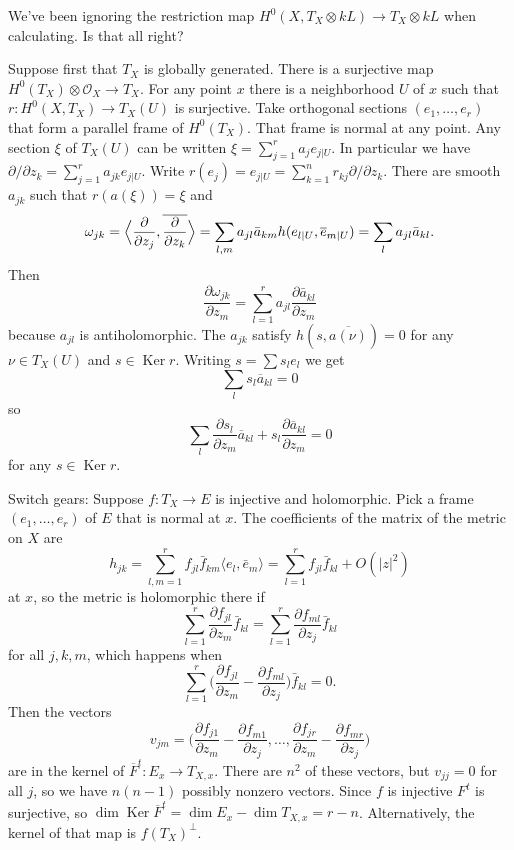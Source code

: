 \documentclass[12pt]{amsart}
\theoremstyle{definition}
\newcommand{\cc}[1]{\mathcal{#1}}
\def\ov#1{\overline{#1}}
\DeclareMathOperator{\Ker}{Ker}
\def\<{\langle}
\def\>{\rangle}
\begin{document}
We've been ignoring the restriction map $H^0(X, T_X \otimes kL) \to T_X \otimes kL$ when calculating.
Is that all right?


Suppose first that $T_X$ is globally generated.
There is a surjective map $H^0(T_X) \otimes \cc O_X \to T_X$.
For any point $x$ there is a neighborhood $U$ of $x$ such that $r: H^0(X,T_X) \to T_X(U)$ is surjective.
Take orthogonal sections $(e_1, \ldots, e_r)$ that form a parallel frame of $H^0(T_X)$.
That frame is normal at any point.
Any section $\xi$ of $T_X(U)$ can be written $\xi = \sum_{j=1}^r a_j e_{j|U}$.
In particular we have $\partial / \partial z_k = \sum_{j=1}^r a_{jk} e_{j|U}$.
Write $r(e_j) = e_{j|U} = \sum_{k=1}^n r_{kj} \partial / \partial z_k$.
There are smooth $a_{jk}$ such that $r(a(\xi)) = \xi$ and
\[
\omega_{jk}
= \Bigl\<
\frac{\partial}{\partial z_j}, \ov{\frac{\partial}{\partial z_k}}
\Bigr\>
= \sum_{l,m} a_{jl} \bar a_{km} h(e_{l|U}, \ov e_{m|U})
= \sum_{l} a_{jl} \bar a_{kl}.
\]
Then
\[
\frac{\partial \omega_{jk}}{\partial z_m}
= \sum_{l=1}^r a_{jl} \frac{\partial \bar a_{kl}}{\partial z_m}
\]
because $a_{jl}$ is antiholomorphic.
The $a_{jk}$ satisfy $h(s, \ov{a(\nu)}) = 0$ for any $\nu \in T_X(U)$ and $s \in \Ker r$.
Writing $s = \sum s_l e_l$ we get
\[
\sum_{l} s_l \ov a_{kl} = 0
\]
so
\[
\sum_l \frac{\partial s_l}{\partial z_m} \ov a_{kl} 
+ s_l \frac{\partial \ov a_{kl}}{\partial z_m} = 0
\]
for any $s \in \Ker r$.



Switch gears:
Suppose $f : T_X \to E$ is injective and holomorphic.
Pick a frame $(e_1, \ldots, e_r)$ of $E$ that is normal at $x$.
The coefficients of the matrix of the metric on $X$ are
\[
h_{jk} 
= \sum_{l,m=1}^r f_{jl} \bar f_{km} \< e_l, \bar e_m \>
= \sum_{l=1}^r f_{jl} \bar f_{kl} + O(|z|^2)
\]
at $x$, so the metric is holomorphic there if
\[
\sum_{l=1}^r \frac{\partial f_{jl}}{\partial z_m} \bar f_{kl} 
= \sum_{l=1}^r \frac{\partial f_{ml}}{\partial z_j} \bar f_{kl} 
\]
for all $j,k,m$, which happens when
\[
\sum_{l=1}^r \biggl(
\frac{\partial f_{jl}}{\partial z_m}
- \frac{\partial f_{ml}}{\partial z_j}
\biggr) \bar f_{kl} 
= 0.
\]
Then the vectors
\[
v_{jm} = 
\biggl(
\frac{\partial f_{j1}}{\partial z_m}
- \frac{\partial f_{m1}}{\partial z_j},
\ldots,
\frac{\partial f_{jr}}{\partial z_m}
- \frac{\partial f_{mr}}{\partial z_j}
\biggr)
\]
are in the kernel of $\ov F^t : E_x \to T_{X,x}$.
There are $n^2$ of these vectors, but $v_{jj} = 0$ for all $j$, so we have $n(n-1)$ possibly nonzero vectors.
Since $f$ is injective $F^t$ is surjective, so $\dim \Ker \ov F^t = \dim E_x - \dim T_{X,x} = r - n$.
Alternatively, the kernel of that map is $f(T_X)^\perp$.
\end{document}
